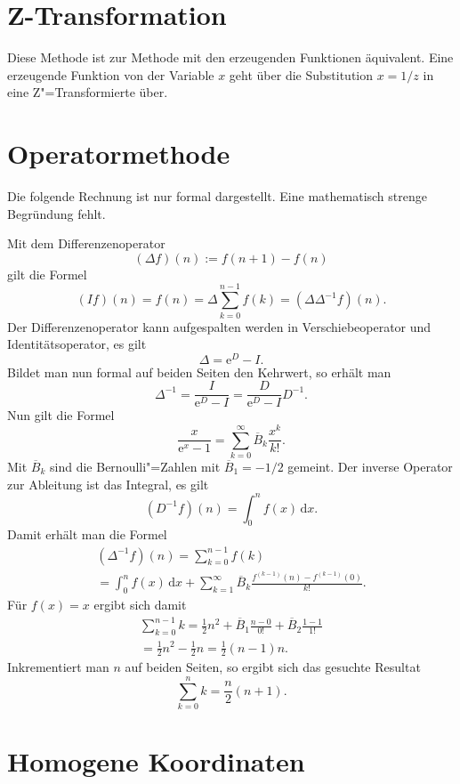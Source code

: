 \documentclass[a4paper,10pt,fleqn,twocolumn,twoside]{scrartcl}
\newcommand{\ee}{\mathrm{e}}
\begin{document}
\section{Z-Transformation}

Diese Methode ist zur Methode mit den erzeugenden
Funktionen äquivalent. Eine erzeugende Funktion von der
Variable $x$ geht über die Substitution $x=1/z$ in
eine Z"=Transformierte über.

\section{Operatormethode}

Die folgende Rechnung ist nur formal dargestellt. Eine
mathematisch strenge Begründung fehlt.

Mit dem Differenzenoperator
\[(\Delta f)(n) := f(n+1)-f(n)\]
gilt die Formel
\[(If)(n) = f(n) = \Delta\sum_{k=0}^{n-1}f(k)
= (\Delta\Delta^{-1}f)(n).\]
Der Differenzenoperator kann aufgespalten werden in
Verschiebeoperator und Identitätsoperator, es gilt%
\[\Delta = \ee^D-I.\]
Bildet man nun formal auf beiden Seiten den Kehrwert,
so erhält man%
\[\Delta^{-1} = \frac{I}{\ee^D-I} = \frac{D}{\ee^D-I}D^{-1}.\]
Nun gilt die Formel
\[\frac{x}{\ee^x-1} = \sum_{k=0}^\infty \overline{B}_k \frac{x^k}{k!}.\]
Mit $\overline{B}_k$ sind die Bernoulli"=Zahlen mit
$\overline{B}_1=-1/2$ gemeint.
Der inverse Operator zur Ableitung ist das Integral, es gilt%
\[(D^{-1}f)(n) = \int_0^n f(x)\,\mathrm dx.\]
Damit erhält man die Formel
\begin{gather*}
(\Delta^{-1} f)(n) = \sum_{k=0}^{n-1} f(k)\\
= \int_0^n f(x)\,\mathrm dx
+ \sum_{k=1}^\infty \overline{B}_k
\frac{f^{(k-1)}(n)-f^{(k-1)}(0)}{k!}.
\end{gather*}
Für $f(x)=x$ ergibt sich damit
\begin{gather*}
\sum_{k=0}^{n-1}k
= \frac{1}{2}n^2+\overline{B}_1 \frac{n-0}{0!}
+\overline{B}_2 \frac{1-1}{1!}\\
= \frac{1}{2}n^2-\frac{1}{2}n
= \frac{1}{2}(n-1)n.
\end{gather*}
Inkrementiert man $n$ auf beiden Seiten, so ergibt sich das
gesuchte Resultat%
\[\sum_{k=0}^n k = \frac{n}{2}(n+1).\]

\section{Homogene Koordinaten}
\end{document}
